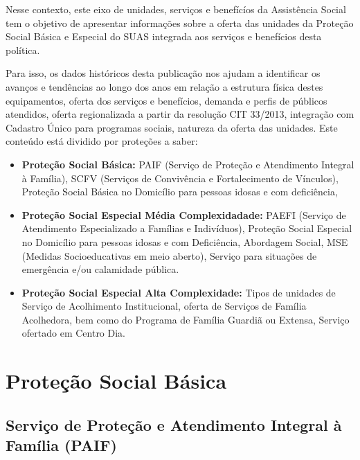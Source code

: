 \documentclass[
  brazilian]{report}
\begin{document}
Nesse contexto, este eixo de unidades, serviços e benefícíos da
Assistência Social tem o objetivo de apresentar informações sobre a
oferta das unidades da Proteção Social Básica e Especial do SUAS
integrada aos serviços e benefícios desta política.

Para isso, os dados históricos desta publicação nos ajudam a identificar
os avanços e tendências ao longo dos anos em relação a estrutura física
destes equipamentos, oferta dos serviços e benefícios, demanda e perfis
de públicos atendidos, oferta regionalizada a partir da resolução CIT
33/2013, integração com Cadastro Único para programas sociais, natureza
da oferta das unidades. Este conteúdo está dividido por proteções a
saber:

\begin{itemize}
\item
  \textbf{Proteção Social Básica:} PAIF (Serviço de Proteção e
  Atendimento Integral à Família), SCFV (Serviços de Convivência e
  Fortalecimento de Vínculos), Proteção Social Básica no Domicílio para
  pessoas idosas e com deficiência,
\item
  \textbf{Proteção Social Especial Média Complexidadade:} PAEFI (Serviço
  de Atendimento Especializado a Famílias e Indivíduos), Proteção Social
  Especial no Domicílio para pessoas idosas e com Deficiência, Abordagem
  Social, MSE (Medidas Socioeducativas em meio aberto), Serviço para
  situações de emergência e/ou calamidade pública.
\item
  \textbf{Proteção Social Especial Alta Complexidade:} Tipos de unidades
  de Serviço de Acolhimento Institucional, oferta de Serviços de Família
  Acolhedora, bem como do Programa de Família Guardiã ou Extensa,
  Serviço ofertado em Centro Dia.
\end{itemize}

\hypertarget{proteuxe7uxe3o-social-buxe1sica}{%
\section{Proteção Social Básica}\label{proteuxe7uxe3o-social-buxe1sica}}

\hypertarget{serviuxe7o-de-proteuxe7uxe3o-e-atendimento-integral-uxe0-famuxedlia-paif}{%
\subsection{Serviço de Proteção e Atendimento Integral à Família
(PAIF)}\label{serviuxe7o-de-proteuxe7uxe3o-e-atendimento-integral-uxe0-famuxedlia-paif}}
\end{document}
